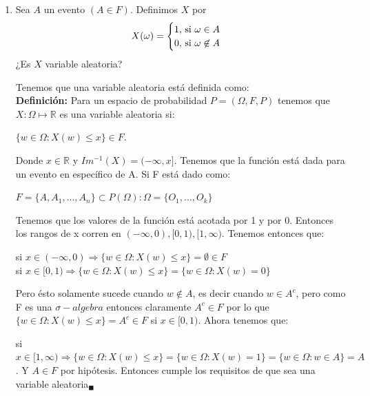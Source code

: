 \documentclass[12pt,a4paper]{report}
\begin{document}
	\begin{enumerate}
		\item {
			Sea $A$ un evento $(A \in F)$. Definimos $X$ por
			\[
				X(\omega) =
				\begin{cases}
					1, $ si $\omega \in A\\
					0, $ si $\omega \not\in A
				\end{cases}
			\]
			¿Es $X$ variable aleatoria?
			
			Tenemos que una variable aleatoria está definida como: \\
			\textbf{Definición:} Para un espacio de probabilidad $P=(\Omega,F,P)$ tenemos que $X:\Omega \mapsto \mathds{R}$ es una variable aleatoria si:
        		   	\begin{center}
			   $ \lbrace w\in \Omega : X(w) \leq x \rbrace \in F.$
			\end{center}
			Donde $x\in \mathds{R}$ y $Im^{-1}(X)=(-\infty,x]$. Tenemos que la función está dada para un evento en específico de A. Si F está dado como: \\
			\begin{center}
			    $F= \lbrace A, A_{1},...,A_{n} \rbrace \subset P(\Omega): \Omega = \lbrace O_{1},...,O_{k} \rbrace $
			\end{center}
			Tenemos que los valores de la función está acotada por 1 y por 0. Entonces los rangos de x corren en $(-\infty,0),[0,1),[1,\infty)$. Tenemos entonces que:\\
		    \begin{center}
		        si $x\in (-\infty,0) \Rightarrow \lbrace w \in \Omega: X(w) \leq x \rbrace =  \emptyset  \in F $\\
		        si $x\in [0,1)  \Rightarrow \lbrace w \in \Omega: X(w) \leq x \rbrace = \lbrace w\in \Omega : X(w)=0 \rbrace$
		    \end{center}
		    Pero ésto solamente sucede cuando $w\notin A $, es decir cuando $w \in A^c$, pero como F es una $\sigma-algebra$ entonces claramente $A^c\in F$ por lo que $\lbrace w \in \Omega : X(w) \leq x \rbrace = A^c \in F$ si $x\in [0,1)$.  Ahora tenemos que:\\
		    \begin{center}
		        si $x\in [1,\infty) \Rightarrow \lbrace w \in \Omega : X(w) \leq x \rbrace = \lbrace w \in \Omega : X(w)=1 \rbrace  = \lbrace w\in \Omega: w \in A \rbrace = A$. 
		        Y $A \in F$ por hipótesis. Entonces cumple los requisitos de que sea una variable aleatoria$_{\blacksquare}$
\end{center}

}
\end{enumerate}
\end{document}
